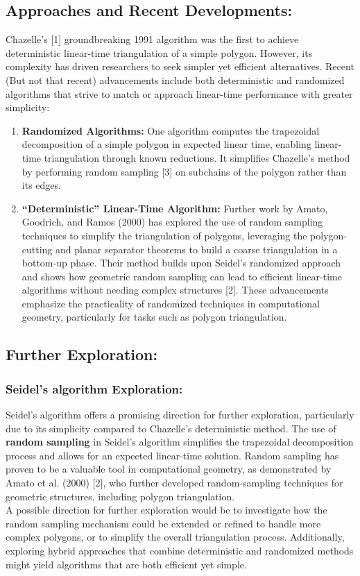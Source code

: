 \documentclass{article}
\begin{document}
\subsection*{Approaches and Recent Developments:}
Chazelle's [1] groundbreaking 1991 algorithm was the first to achieve deterministic linear-time triangulation of a simple polygon. However, its complexity has driven researchers to seek simpler yet efficient alternatives. Recent (But not that recent) advancements include both deterministic and randomized algorithms that strive to match or approach linear-time performance with greater simplicity:
\begin{enumerate}
    \item \textbf{Randomized Algorithms: }
    One algorithm computes the trapezoidal decomposition of a simple polygon in expected linear time, enabling linear-time triangulation through known reductions. It simplifies Chazelle's method by performing random sampling [3] on subchains of the polygon rather than its edges. 
    \item \textbf{``Deterministic'' Linear-Time Algorithm: }
    Further work by Amato, Goodrich, and Ramos (2000) has explored the use of random sampling techniques to simplify the triangulation of polygons, leveraging the polygon-cutting and planar separator theorems to build a coarse triangulation in a bottom-up phase. Their method builds upon Seidel's randomized approach and shows how geometric random sampling can lead to efficient linear-time algorithms without needing complex structures [2]. 
    These advancements emphasize the practicality of randomized techniques in computational geometry, particularly for tasks such as polygon triangulation.
\end{enumerate}

\subsection*{Further Exploration: }

\subsubsection*{Seidel's algorithm Exploration: }
Seidel's algorithm offers a promising direction for further exploration, particularly due to its simplicity compared to Chazelle's deterministic method. The use of \textbf{random sampling} in Seidel’s algorithm simplifies the trapezoidal decomposition process and allows for an expected linear-time solution. Random sampling has proven to be a valuable tool in computational geometry, as demonstrated by Amato et al. (2000) [2], who further developed random-sampling techniques for geometric structures, including polygon triangulation.
\\
A possible direction for further exploration would be to investigate how the random sampling mechanism could be extended or refined to handle more complex polygons, or to simplify the overall triangulation process. Additionally, exploring hybrid approaches that combine deterministic and randomized methods might yield algorithms that are both efficient yet simple.
\end{document}

